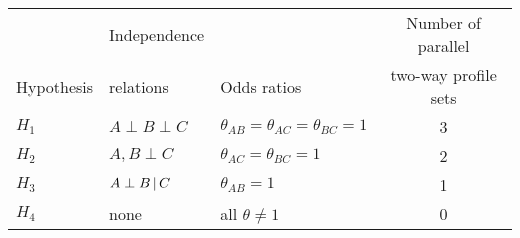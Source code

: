 \begin{center}
 \begin{tabular}{lll c}
 \hline
            &  Independence  &             &  Number of parallel    \\
Hypothesis  &  relations     & Odds ratios &  two-way profile sets  \\ \hline
$H_1$  & $A \perp B \perp C$ &  $\theta_{AB} = \theta_{AC} = \theta_{BC} = 1$ & 3 \\
%
$H_2$  & $A , B \perp C$     &  $\theta_{AC} = \theta_{BC} = 1$ & 2 \\
%
$H_3$  & $A \perp B \, | \, C$ &  $\theta_{AB} = 1$               & 1 \\
%
$H_4$  & none                & all $\theta \neq 1$               & 0 \\
%
  \hline
 \end{tabular}
 \end{center}
